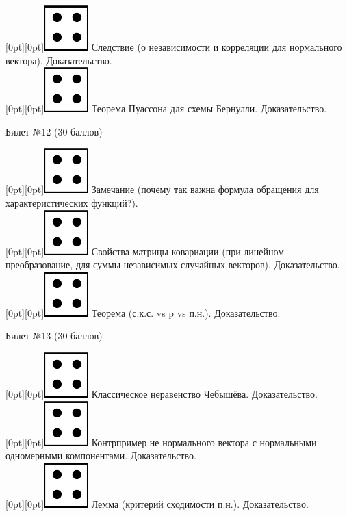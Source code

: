 \documentclass[10pt]{article}
\begin{document}
\raisebox{-1pt}[0pt][0pt]{\includegraphics[width=0.02\linewidth]{4.png}} Следствие (о независимости и корреляции для нормального вектора). Доказательство. \\ 
\raisebox{-1pt}[0pt][0pt]{\includegraphics[width=0.02\linewidth]{4.png}} Теорема Пуассона для схемы Бернулли. Доказательство. \\
\begin{center} {\Large Билет №12 (30 баллов)} \end{center}
\raisebox{-1pt}[0pt][0pt]{\includegraphics[width=0.02\linewidth]{4.png}} Замечание (почему так важна формула обращения для характеристических функций?). \\
\raisebox{-1pt}[0pt][0pt]{\includegraphics[width=0.02\linewidth]{4.png}} Свойства матрицы ковариации (при линейном преобразование, для суммы независимых случайных векторов). Доказательство. \\
\raisebox{-1pt}[0pt][0pt]{\includegraphics[width=0.02\linewidth]{4.png}} Теорема (с.к.с. vs p vs п.н.). Доказательство. \\ 
\begin{center} {\Large Билет №13 (30 баллов)} \end{center}
\raisebox{-1pt}[0pt][0pt]{\includegraphics[width=0.02\linewidth]{4.png}} Классическое неравенство Чебышёва. Доказательство. \\
\raisebox{-1pt}[0pt][0pt]{\includegraphics[width=0.02\linewidth]{4.png}} Контрпример не нормального вектора с нормальными одномерными компонентами. Доказательство. \\ 
\raisebox{-1pt}[0pt][0pt]{\includegraphics[width=0.02\linewidth]{4.png}} Лемма (критерий сходимости п.н.). Доказательство. \\
\end{document}
